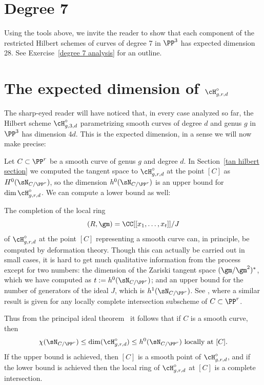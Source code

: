 \section{Degree 7}

Using the tools above, we invite the reader to show that each component of the restricted Hilbert schemes of curves of degree 7
in $\PP^3$ has expected dimension 28. See Exercise~\ref{degree 7 analysis} for an outline.

 
\section{The expected dimension of \texorpdfstring{$\cH^\circ_{g,r,d}$}{$H_{g,r,d}$}}\label{chi N}


The sharp-eyed reader will have noticed that,
in every case analyzed so far,  the Hilbert scheme
$\cH^\circ_{g,3,d}$ parametrizing smooth curves of degree $d$ and genus $g$ in $\PP^3$ has dimension $4d$. 
This is the expected dimension, in a sense we will now make precise:


Let $C\subset \PP^r$ be a smooth curve of genus $g$ and degree $d$. In Section~\ref{tan hilbert section}
we computed the tangent space to $\cH^\circ_{g,r,d}$ at the point $[C]$ as $H^0(\sN_{C/\PP^r})$, so 
the dimension $h^0( \sN_{C/\PP^r})$ is an upper bound for $\dim \cH^\circ_{g,r,d}$. We can compute a lower bound as well:


\begin{fact}\label{deformation bound}
The completion of the local ring 
$$
(R,\gm) = \CC[[ x_1,\dots, x_t]]/J
$$ 
of $\cH^\circ_{g,r,d}$ at the point $[C]$ representing a smooth curve can, in principle, be computed by deformation theory.
Though this can actually be carried out in small cases, it is hard to get much qualitative information from the process
except for two numbers: the dimension of the Zariski tangent space $(\gm/\gm^{2})^{*}$, which we have computed as 
$t:= h^0(\sN_{C/\PP^r})$; 
and an upper bound for the number of generators of the ideal $J$, which is 
$h^1(\sN_{C/\PP^r})$. See
\cite[Corollaries 6.2.5, 6.4.11 and Proposition 6.5.2]{MR2223408}, where a similar result is given for any
locally complete intersection subscheme of $C\subset \PP^r$.

Thus from the principal ideal theorem~\cite[Theorem 10.2]{Eisenbud1995} it follows that if $C$ is a smooth curve, then 
$$
\chi(\sN_{C/\PP^r}) \leq \dim (\cH^\circ_{g,r,d})\leq h^0(\sN_{C/\PP^r}) \hbox{ locally at } [C].
$$
If the upper bound is achieved, then $[C]$ is a smooth point of $\cH^\circ_{g,r,d}$, and if the lower bound is achieved
then the local ring of $\cH^\circ_{g,r,d}$ at $[C]$ is a complete intersection.
\end{fact}

